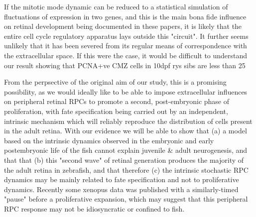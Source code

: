 \documentclass{ut-thesis}
\begin{document}
If the mitotic mode dynamic can be reduced to a statistical simulation of fluctuations of expression in two genes, and this is the main bona fide influence on retinal development being documented in these papers, it is likely that the entire cell cycle regulatory apparatus lays outside this "circuit". It further seems unlikely that it has been severed from its regular means of correspondence with the extracellular space. If this were the case, it would be difficult to understand our result showing that PCNA+ve CMZ cells in 10dpf rys sibs are less than 25%

From the perpsective of the original aim of our study, this is a promising possibility, as we would ideally like to be able to impose extracellular influences on peripheral retinal RPCs to promote a second, post-embryonic phase of proliferation, with fate specification being carried out by an independent, intrinsic mechanism which will reliably reproduce the distribution of cells present in the adult retina. With our evidence we will be able to show that (a) a model based on the intrinsic dynamics observed in the embryonic and early postembryonic life of the fish cannot explain juvenile & adult neurogenesis, and that that (b) this "second wave" of retinal generation produces the majority of the adult retina in zebrafish, and that therefore (c) the intrinsic stochastic RPC dynamics may be mainly related to fate specification and not to proliferative dynamics. Recently some xenopus data was published with a similarly-timed "pause" \cite{} before a proliferative expansion, which may suggest that this peripheral RPC response may not be idiosyncratic or confined to fish.
\end{document}
